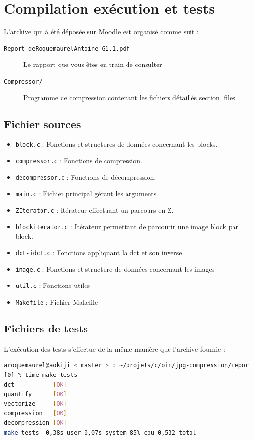 \documentclass[a4paper, 11pt]{article}
\begin{document}
	\maketitle
	\section{Compilation exécution et tests}
	L'archive qui à été déposée sur Moodle est organisé comme suit : 
	\begin{description}
		\item[\texttt{Report\_deRoquemaurelAntoine\_G1.1.pdf}] Le rapport que vous êtes en train de consulter
		\item[\texttt{Compressor/}] Programme de compression contenant les fichiers détaillés section \ref{files}. 
	\end{description}
	\subsection{Fichier sources}	
	\begin{itemize}
		\item \texttt{block.c} : Fonctions et structures de données concernant les blocks.
		\item \texttt{compressor.c} : Fonctions de compression.
		\item \texttt{decompressor.c} : Fonctions de décompression.
		\item \texttt{main.c} : Fichier principal gérant les arguments
		\item \texttt{ZIterator.c} : Itérateur effectuant un parcours en Z.
		\item \texttt{blockiterator.c} : Itérateur permettant de parcourir une image block par block.
		\item \texttt{dct-idct.c} : Fonctions appliquant la dct et son inverse
		\item \texttt{image.c} : Fonctions et structure de données concernant les images
		\item \texttt{util.c} : Fonctions utiles
		\item \texttt{Makefile} : Fichier Makefile
	\end{itemize}

	\subsection{Fichiers de tests}
	L'exécution des tests s'effectue de la même manière que l'archive fournie : 
	\begin{lstlisting}[language=Bash, caption=Execution des tests, label=lst:test]
aroquemaurel@aokiji < master > : ~/projets/c/oim/jpg-compression/report
[0] % time make tests 
dct           [OK]
quantify      [OK]
vectorize     [OK]
compression   [OK]
decompression [OK]
make tests  0,38s user 0,07s system 85% cpu 0,532 total
	\end{lstlisting}
	\label{files}
\end{document}
